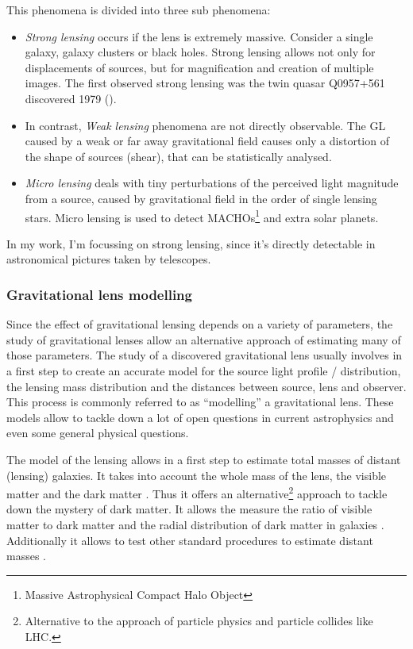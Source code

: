 \documentclass[11pt]{article}
\begin{document}
This phenomena is divided into three sub phenomena:
\begin{itemize}
	\item \emph{Strong lensing} occurs if the lens is extremely massive. Consider a single galaxy, galaxy clusters or black holes.
Strong lensing allows not only for displacements of sources, but for magnification and creation of multiple images.
The first observed strong lensing was the twin quasar Q0957+561 discovered 1979 (\cite{walsh19790957}).
  \item In contrast, \emph{Weak lensing} phenomena are not directly observable.
The GL caused by a weak or far away gravitational field causes only a distortion of the shape of sources (shear), that can be statistically analysed.
  \item \emph{Micro lensing} deals with tiny perturbations of the perceived light magnitude from a source, caused by gravitational field in the order of single lensing stars.
Micro lensing is used to detect MACHOs\footnote{Massive Astrophysical Compact Halo Object} and extra solar planets.
\end{itemize}

In my work, I'm focussing on strong lensing, since it's directly detectable in astronomical pictures taken by telescopes.


\subsubsection{Gravitational lens modelling}

Since the effect of gravitational lensing depends on a variety of parameters, the study of gravitational lenses allow an alternative approach of estimating many of those parameters.
The study of a discovered gravitational lens usually involves in a first step to create an accurate model for the source light profile / distribution, the lensing mass distribution and the distances between source, lens and observer.
This process is commonly referred to as ``modelling'' a gravitational lens.
These models allow to tackle down a lot of open questions in current astrophysics and even some general physical questions.

The model of the lensing allows in a first step to estimate total masses of distant (lensing) galaxies.
It takes into account the whole mass of the lens, the visible matter and the dark matter \cite{kochanek1995there}.
Thus it offers an alternative\footnote{Alternative to the approach of particle physics and particle collides like LHC.} approach to tackle down the mystery of dark matter.
It allows the measure the ratio of visible matter to dark matter and the radial distribution of dark matter in galaxies \cite{treukoop04}.
Additionally it allows to test other standard procedures to estimate distant masses \cite{kochanek1995there}.
\end{document}
